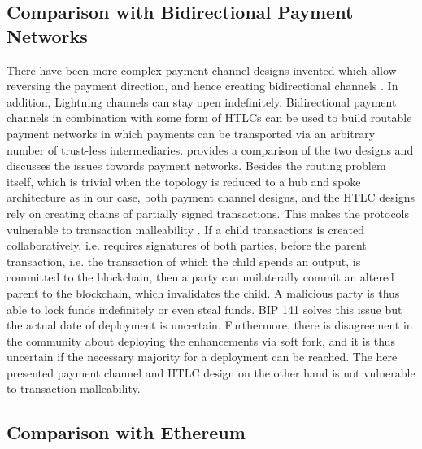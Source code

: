 \subsection{Comparison with Bidirectional Payment Networks}
\label{sec:paymentnetworks}

There have been more complex payment channel designs invented which allow reversing the payment direction, and hence creating bidirectional channels \parencite{decker2015Duplex,poonbitcoin}. In addition, Lightning channels \parencite{poonbitcoin} can stay open indefinitely. Bidirectional payment channels in combination with some form of \ac{HTLC}s can be used to build routable payment networks in which payments can be transported via an arbitrary number of trust-less intermediaries. \cite{cryptoeprint:2016:408} provides a comparison of the two designs and discusses the issues towards payment networks. Besides the routing problem itself, which is trivial when the topology is reduced to a hub and spoke architecture as in our case, both payment channel designs, and the \ac{HTLC} designs rely on creating chains of partially signed transactions. This makes the protocols vulnerable to transaction malleability \parencite{Andrychowicz2015}. If a child transactions is created collaboratively, i.e.  requires signatures of both parties, before the parent transaction, i.e. the transaction of which the child spends an output, is committed to the blockchain, then a party can unilaterally commit an altered parent to the blockchain, which invalidates the child. A malicious party is thus able to lock funds indefinitely or even steal funds. \ac{BIP} 141 \parencite{bip141} solves this issue but the actual date of deployment is uncertain. Furthermore, there is disagreement in the community about deploying the enhancements via soft fork, and it is thus uncertain if the necessary majority for a deployment can be reached. The here presented payment channel and \ac{HTLC} design on the other hand is not vulnerable to transaction malleability. 

\subsection{Comparison with Ethereum}

